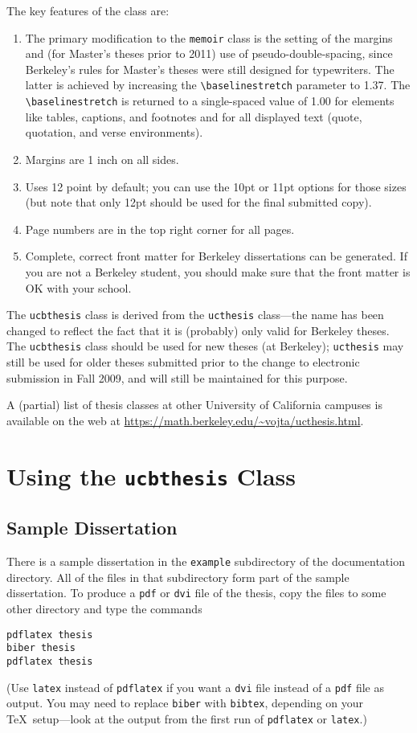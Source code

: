 \documentclass[11pt]{article}
\newcommand*{\pkg}[1]{\texttt{#1}}
\begin{document}
\smallbreak
The key features of the class are:
\begin{enumerate}
\item The primary modification to the \pkg{memoir} class is the setting of the
  margins and (for Master's theses prior to 2011) use of pseudo-double-spacing,
  since Berkeley's rules for Master's theses were still designed
  for typewriters.  The latter is achieved by increasing the
  \verb|\baselinestretch| parameter to 1.37.  The \verb|\baselinestretch|
  is returned to a single-spaced value of 1.00 for elements like tables,
  captions, and footnotes and for all displayed text (quote, quotation,
  and verse environments).
\item Margins are 1 inch on all sides.
\item Uses 12 point by default; you can use the 10pt or 11pt options for
  those sizes (but note that only 12pt should be used for the final
  submitted copy).
\item Page numbers are in the top right corner for all pages.
\item Complete, correct front matter for Berkeley dissertations can be
  generated.  If you are not a Berkeley student, you should make sure
  that the front matter is OK with your school.
\end{enumerate}

The \pkg{ucbthesis} class is derived from the \pkg{ucthesis} class---the
name has been changed to reflect the fact that it is (probably) only
valid for Berkeley theses.
The \pkg{ucbthesis} class should be used for new theses (at Berkeley);
\pkg{ucthesis} may still be used for older theses submitted prior to the
change to electronic submission in Fall 2009, and will still be maintained
for this purpose.

A (partial) list of thesis classes at other University of California
campuses is available on the web at
\url{https://math.berkeley.edu/~vojta/ucthesis.html}.

\section{Using the \pkg{ucbthesis} Class}

\subsection{Sample Dissertation}

There is a sample dissertation in the \texttt{example} subdirectory
of the documentation directory.  All of the files in that subdirectory
form part of the sample dissertation.  To produce a \texttt{pdf} or
\texttt{dvi} file of the thesis, copy the files to some other directory
and type the commands
\begin{lstlisting}
pdflatex thesis
biber thesis
pdflatex thesis
\end{lstlisting}
(Use \texttt{latex} instead of \texttt{pdflatex} if you want a \texttt{dvi}
file instead of a \texttt{pdf} file as output.  You may need to replace
\texttt{biber} with \texttt{bibtex}, depending on your \TeX\ setup---look
at the output from the first run of \pkg{pdflatex} or \pkg{latex}.)
\end{document}
